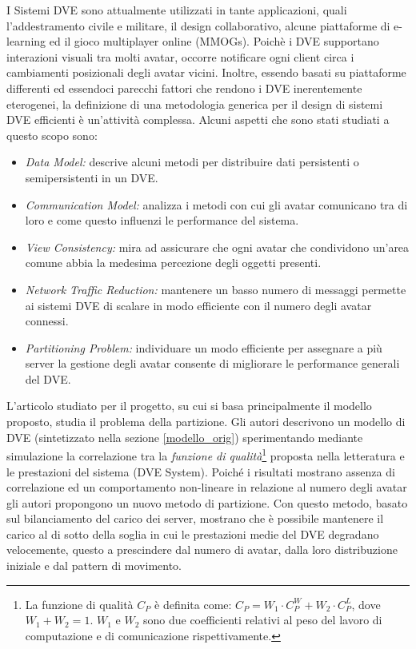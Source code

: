 \documentclass[a4paper, 11pt, oneside]{book}
\theoremstyle{definition}
\theoremstyle{remark}
\begin{document}
I Sistemi DVE sono attualmente utilizzati in tante applicazioni, quali
l'addestramento civile e militare, il design collaborativo, alcune piattaforme
di e-learning ed il gioco multiplayer online (MMOGs).
Poichè i DVE supportano interazioni visuali tra molti avatar, occorre notificare
ogni client circa i cambiamenti posizionali degli avatar vicini.
Inoltre, essendo basati su piattaforme differenti ed essendoci parecchi fattori
che rendono i DVE inerentemente eterogenei, la definizione di una metodologia
generica per il design di sistemi DVE efficienti è un'attività complessa.
Alcuni aspetti che sono stati studiati a questo scopo sono:
\begin{itemize}
\item
\emph{Data Model:} descrive alcuni metodi per distribuire dati persistenti o
semipersistenti in un DVE.
\item
\emph{Communication Model:} analizza i metodi con cui gli avatar comunicano
tra di loro e come questo influenzi le performance del sistema.
\item
\emph{View Consistency:} mira ad assicurare che ogni avatar che condividono
un'area comune abbia la medesima percezione degli oggetti presenti.
\item
\emph{Network Traffic Reduction:} mantenere un basso numero di messaggi
permette ai sistemi DVE di scalare in modo efficiente con il numero
degli avatar connessi.
\item
\emph{Partitioning Problem:} individuare un modo efficiente per assegnare
a più server la gestione degli avatar consente di migliorare le performance
generali del DVE.
\end{itemize}

L'articolo
\cite{IDVE}
studiato per il progetto, su cui si basa
principalmente il modello proposto,
studia il problema della partizione. Gli autori descrivono un modello di DVE
(sintetizzato nella sezione \ref{modello_orig}) sperimentando mediante
simulazione la correlazione tra la \emph{funzione di qualità}\footnote{La
funzione di qualità $C_P$ è definita come:
$C_P = W_1 \cdot C_P^W + W_2 \cdot C_P^L$,  dove $W_1 + W_2 = 1$. $W_1$ e $W_2$
sono due coefficienti relativi al peso del lavoro di computazione e di
comunicazione rispettivamente.} proposta nella
letteratura e le prestazioni del sistema (DVE System). Poiché i risultati
mostrano assenza di correlazione ed un comportamento non-lineare in relazione
al numero degli avatar gli autori propongono un nuovo metodo di partizione.
Con questo metodo, basato sul bilanciamento del carico dei server, mostrano
che è possibile mantenere il carico al di sotto della soglia in cui
le prestazioni medie del DVE degradano velocemente, questo a prescindere dal
numero di avatar, dalla loro distribuzione iniziale e dal pattern di movimento.
\end{document}
